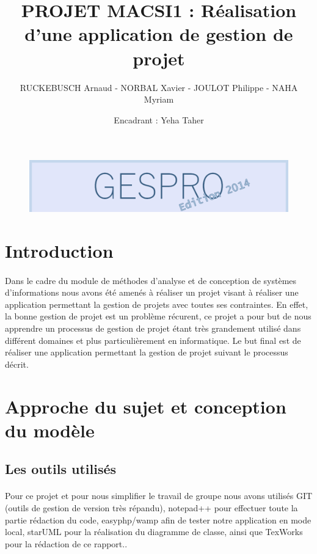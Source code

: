 \documentclass[a4paper, 12pt]{article}
\title{PROJET MACSI1 : Réalisation d'une application de gestion de projet }
\author{RUCKEBUSCH Arnaud - NORBAL Xavier - JOULOT Philippe - NAHA Myriam}
\date{Encadrant : Yeha Taher}
\makeatletter
\def\maketitle{
  \null
  \thispagestyle{empty}
  \vfill
  \begin{center}\leavevmode
    \normalfont
    {\LARGE \@title\par}
    \vskip 1cm
    {\Large \@author\par}
    \vskip 1cm
    {\Large \@date\par}
  \end{center}
  \vfill
  \null
  \cleardoublepage
  }
\makeatother
\begin{document}
\begin{figure}[h!]
	\includegraphics[width=1\textwidth]{GESPRO2014.png}
\end{figure}
\maketitle

\setcounter{page}{1}
\tableofcontents
\newpage

\section{Introduction}
\paragraph{}Dans le cadre du module de méthodes d’analyse et de conception de systèmes d’informations nous avons été amenés à réaliser un projet visant à réaliser une application permettant la gestion de projets avec toutes ses contraintes. En effet, la  bonne gestion de projet est un problème récurent, ce projet a pour but de nous apprendre un processus de gestion de projet étant très grandement utilisé dans différent domaines et plus particulièrement en informatique. Le but final est de réaliser une application permettant la gestion de projet suivant le processus décrit.

\newpage

\section{Approche du sujet et conception du modèle}

\subsection{Les outils utilisés}
\paragraph{}Pour ce projet et pour nous simplifier le travail de groupe nous avons utilisés GIT (outils de gestion de version très répandu), notepad++ pour effectuer toute la partie rédaction du code, easyphp/wamp afin de tester notre application en mode local, starUML pour la réalisation du diagramme de classe, ainsi que TexWorks pour la rédaction de ce rapport..
\end{document}
